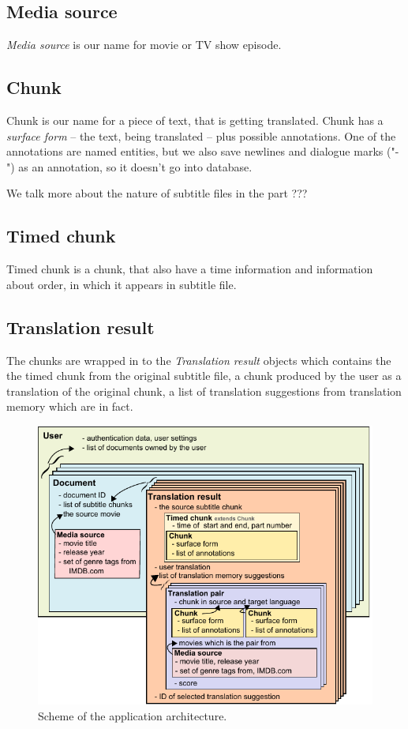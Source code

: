 \subsection*{Media source}
\emph{Media source} is our name for movie or TV show episode.

\subsection*{Chunk}
Chunk is our name for a piece of text, that is getting translated. Chunk has a \emph{surface form} -- the text, being translated -- plus possible annotations. One of the annotations are named entities, but we also save newlines and dialogue marks ("-") as an annotation, so it doesn't go into database.

We talk more about the nature of subtitle files in the part ???

\subsection*{Timed chunk}
Timed chunk is a chunk, that also have a time information and information about order, in which it appears in subtitle file.

\subsection*{Translation result}
The chunks are wrapped in to the \emph{Translation result} objects which contains the the timed chunk from the original subtitle file, a chunk produced by the user as a translation of the original chunk, a list of translation suggestions from translation memory which are in fact.


\begin{figure}[h]
\begin{center}
\includegraphics{figures/shared_classes.pdf}
\end{center}
\caption{Scheme of the application architecture.}\label{projectStructure:logical}
\end{figure}

